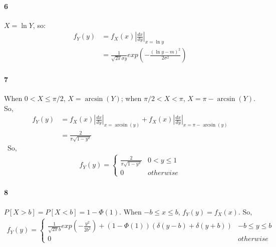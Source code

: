 \documentclass[22pt]{article}
\begin{document}
	\paragraph{6} $X = \ln Y$, so:
	\begin{align}
	f_Y(y) & = f_X(x)|\frac{dx}{dy}|_{x = \ln y}\\
	& = \frac{1}{\sqrt{2 \pi}\sigma y}exp(-\frac{(\ln y-m)^2}{2 \sigma^2})
	\end{align}

	\paragraph{7} When $0 < X \leq \pi/2$, $X = \arcsin(Y)$; when $\pi/2 <X<\pi$, $X =\pi- \arcsin(Y)$. So,
	\begin{align}
	f_Y(y) & = f_X(x)|\frac{dx}{dy}|_{x = \arcsin(y)}+ f_X(x)|\frac{dx}{dy}|_{x = \pi-\arcsin(y)}\\
	& = \frac{2}{\pi\sqrt{1-y^2}}
	\end{align}\
	So, \begin{align}
	f_Y(y) = 
				\begin{cases}
				\frac{2}{\pi\sqrt{1-y^2}} & 0<y\leq1\\
				0 & otherwise
				\end{cases}
	\end{align}

	\paragraph{8} $P[X>b] = P[X < b] = 1-\Phi(1)$.
	When $-b\leq x \leq b$, $f_Y(y) = f_X(x)$.
	So,\begin{align}
	f_Y(y) = 
				\begin{cases}
				 \frac{1}{\sqrt{2 \pi }b}exp(-\frac{y^2}{2b^2}) + (1-\Phi(1))(\delta(y-b)+\delta(y+b) )  & -b\leq y \leq b\\
				 0 & otherwise
				\end{cases}
	\end{align}
\end{document}
